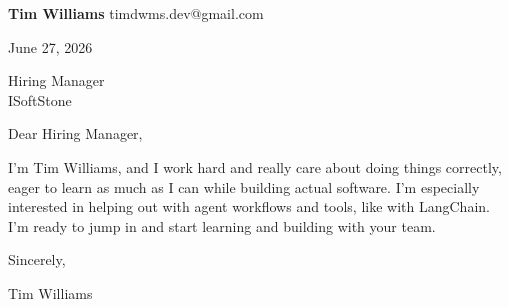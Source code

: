 \documentclass[12pt]{article}
\begin{document}
\textbf{Tim Williams} \hfill timdwms.dev@gmail.com

\vspace{1em}

June 27, 2026

\vspace{1em}

Hiring Manager \\
ISoftStone

\vspace{1em}

Dear Hiring Manager,

I'm Tim Williams, and I work hard and really care about doing things correctly, eager to learn as much as I can while building actual software. I'm especially interested in helping out with agent workflows and tools, like with LangChain. I'm ready to jump in and start learning and building with your team.

\vspace{1em}

Sincerely,

\vspace{2em}

Tim Williams
\end{document}
